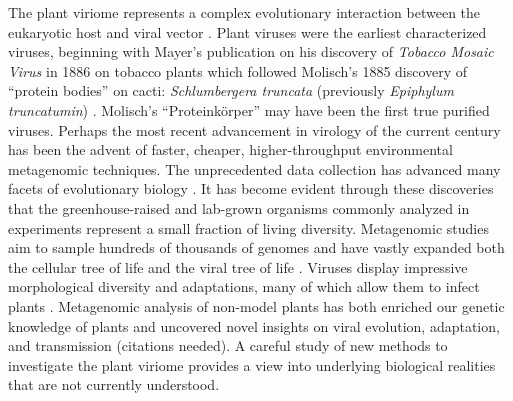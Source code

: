 \documentclass[11pt,letterpaper,titlepage]{article}
\begin{document}
\begin{linenumbers}
The plant viriome represents a complex evolutionary interaction between the eukaryotic host and viral vector \citep{delwart_viral_2007}. 
Plant viruses were the earliest characterized viruses, beginning with Mayer's publication on his discovery of \textit{Tobacco Mosaic Virus} in 1886 on tobacco plants \citep{mayer1886mosaikkrankheit} which followed Molisch's 1885 discovery of ``protein bodies'' on cacti: \textit{Schlumbergera truncata} (previously \textit{Epiphylum truncatumin}) \citep{molisch1885merkwurdige}.
Molisch's ``Proteinkörper'' may have been the first true purified viruses.
Perhaps the most recent advancement in virology of the current century has been the advent of faster, cheaper, higher-throughput environmental metagenomic techniques.
The unprecedented data collection has advanced many facets of evolutionary biology \citep{delwart_viral_2007,lefeuvre_evolution_2019,schulz_towards_2017}.
It has become evident through these discoveries that the greenhouse-raised and lab-grown organisms commonly analyzed in experiments represent a small fraction of living diversity. %
Metagenomic studies aim to sample hundreds of thousands of genomes and have vastly expanded both the cellular tree of life \citep{schulz_towards_2017,hug_new_2016} and the viral tree of life \citep{gregory_marine_2019,lefeuvre_evolution_2019,shi_redefining_2016}. %
Viruses display impressive morphological diversity and adaptations, many of which allow them to infect plants \citep{delwart_viral_2007,lefeuvre_evolution_2019}.
Metagenomic analysis of non-model plants has both enriched our genetic knowledge of plants and uncovered novel insights on viral evolution, adaptation, and transmission (citations needed).
A careful study of new methods to investigate the plant viriome provides a view into underlying biological realities that are not currently understood.


\end{linenumbers}
\end{document}
